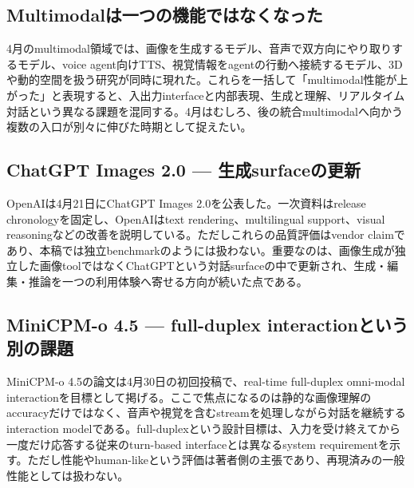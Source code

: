 \begingroup\raggedright
\subsection{Multimodalは一つの機能ではなくなった}
\par\endgroup

4月のmultimodal領域では、画像を生成するモデル、音声で双方向にやり取りするモデル、voice agent向けTTS、視覚情報をagentの行動へ接続するモデル、3Dや動的空間を扱う研究が同時に現れた。これらを一括して「multimodal性能が上がった」と表現すると、入出力interfaceと内部表現、生成と理解、リアルタイム対話という異なる課題を混同する。4月はむしろ、後の統合multimodalへ向かう複数の入口が別々に伸びた時期として捉えたい。\autocite{src-0f697d747d9c,src-3fa7f7c1140f,src-d113b486a585,src-d33ba68aac3c,src-d8b7c1c36830,src-fec81b98fdc8}


\begingroup\raggedright
\subsection{ChatGPT Images 2.0 — 生成surfaceの更新}
\par\endgroup

OpenAIは4月21日にChatGPT Images 2.0を公表した。一次資料はrelease chronologyを固定し、OpenAIはtext rendering、multilingual support、visual reasoningなどの改善を説明している。ただしこれらの品質評価はvendor claimであり、本稿では独立benchmarkのようには扱わない。重要なのは、画像生成が独立した画像toolではなくChatGPTという対話surfaceの中で更新され、生成・編集・推論を一つの利用体験へ寄せる方向が続いた点である。\autocite{src-0f697d747d9c}


\begingroup\raggedright
\subsection{MiniCPM-o 4.5 — full-duplex interactionという別の課題}
\par\endgroup

MiniCPM-o 4.5の論文は4月30日の初回投稿で、real-time full-duplex omni-modal interactionを目標として掲げる。ここで焦点になるのは静的な画像理解のaccuracyだけではなく、音声や視覚を含むstreamを処理しながら対話を継続するinteraction modelである。full-duplexという設計目標は、入力を受け終えてから一度だけ応答する従来のturn-based interfaceとは異なるsystem requirementを示す。ただし性能やhuman-likeという評価は著者側の主張であり、再現済みの一般性能としては扱わない。\autocite{src-d33ba68aac3c}


